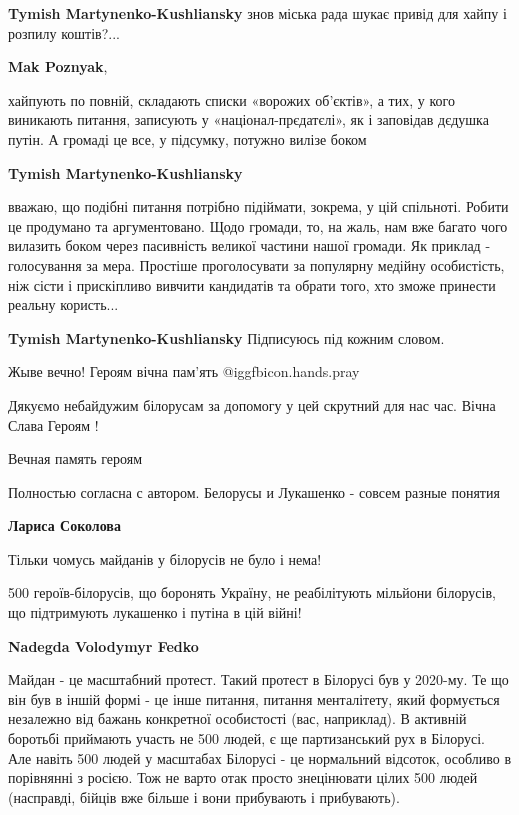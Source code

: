 \begin{itemize}
\begin{itemize} %
\textbf{Tymish Martynenko-Kushliansky} знов міська рада шукає привід для хайпу і розпилу коштів?...

\textbf{Mak Poznyak}, 

хайпують по повній, складають списки «ворожих об’єктів», а тих, у кого
виникають питання, записують у «націонал-прєдатєлі», як і заповідав дєдушка
путін. А громаді це все, у підсумку, потужно вилізе боком

\textbf{Tymish Martynenko-Kushliansky} 

вважаю, що подібні питання потрібно підіймати, зокрема, у цій спільноті. Робити
це продумано та аргументовано. Щодо громади, то, на жаль, нам вже багато чого
вилазить боком через пасивність великої частини нашої громади. Як приклад -
голосування за мера. Простіше проголосувати за популярну медійну особистість,
ніж сісти і прискіпливо вивчити кандидатів та обрати того, хто зможе принести
реальну користь...

\textbf{Tymish Martynenko-Kushliansky} Підписуюсь під кожним словом.
\end{itemize} %

Жыве вечно!
Героям вічна пам'ять  @igg{fbicon.hands.pray} 

Дякуємо небайдужим білорусам за допомогу у цей скрутний для нас час. Вічна Слава Героям !

Вечная память героям

Полностью согласна с автором. Белорусы и Лукашенко - совсем разные понятия

\begin{itemize} %
\textbf{Лариса Соколова} 

Тільки чомусь майданів у білорусів не було і нема!

500 героїв-білорусів, що боронять Україну, не реабілітують мільйони білорусів,
що підтримують лукашенко і путіна в цій війні!

\textbf{Nadegda Volodymyr Fedko} 

Майдан - це масштабний протест. Такий протест в Білорусі був у 2020-му. Те що
він був в іншій формі - це інше питання, питання менталітету, який формується
незалежно від бажань конкретної особистості (вас, наприклад). В активній
боротьбі приймають участь не 500 людей, є ще партизанський рух в Білорусі. Але
навіть 500 людей у масштабах Білорусі - це нормальний відсоток, особливо в
порівнянні з росією. Тож не варто отак просто знецінювати цілих 500 людей
(насправді, бійців вже більше і вони прибувають і прибувають).


\end{itemize}
\end{itemize}
